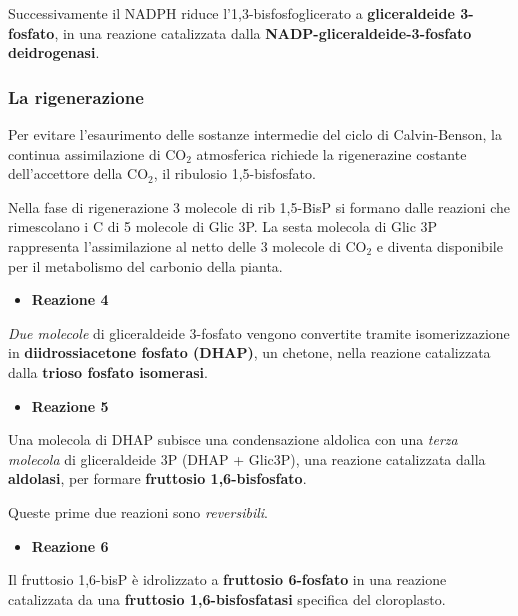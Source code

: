 \documentclass[]{article}
\begin{document}
Successivamente il NADPH riduce l'1,3-bisfosfoglicerato a
\textbf{gliceraldeide 3-fosfato}, in una reazione catalizzata dalla
\textbf{NADP-gliceraldeide-3-fosfato deidrogenasi}.

\subsubsection{La rigenerazione}\label{la-rigenerazione}

Per evitare l'esaurimento delle sostanze intermedie del ciclo di
Calvin-Benson, la continua assimilazione di CO$_2$ atmosferica richiede
la rigenerazine costante dell'accettore della CO$_2$, il ribulosio
1,5-bisfosfato.

Nella fase di rigenerazione 3 molecole di rib 1,5-BisP si formano dalle
reazioni che rimescolano i C di 5 molecole di Glic 3P. La sesta molecola
di Glic 3P rappresenta l'assimilazione al netto delle 3 molecole di
CO$_2$ e diventa disponibile per il metabolismo del carbonio della
pianta.

\begin{itemize}
\itemsep1pt\parskip0pt
\item
  \textbf{Reazione 4}
\end{itemize}

\emph{Due molecole} di gliceraldeide 3-fosfato vengono convertite
tramite isomerizzazione in \textbf{diidrossiacetone fosfato (DHAP)}, un
chetone, nella reazione catalizzata dalla \textbf{trioso fosfato
isomerasi}.

\begin{itemize}
\itemsep1pt\parskip0pt
\item
  \textbf{Reazione 5}
\end{itemize}

Una molecola di DHAP subisce una condensazione aldolica con una
\emph{terza molecola} di gliceraldeide 3P (DHAP + Glic3P), una reazione
catalizzata dalla \textbf{aldolasi}, per formare \textbf{fruttosio
1,6-bisfosfato}.

Queste prime due reazioni sono \emph{reversibili}.

\begin{itemize}
\itemsep1pt\parskip0pt
\item
  \textbf{Reazione 6}
\end{itemize}

Il fruttosio 1,6-bisP è idrolizzato a \textbf{fruttosio 6-fosfato} in
una reazione catalizzata da una \textbf{fruttosio 1,6-bisfosfatasi}
specifica del cloroplasto.
\end{document}

